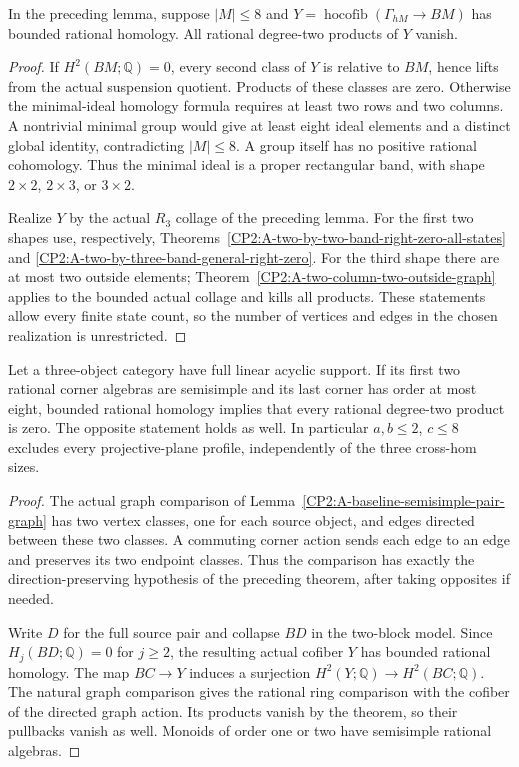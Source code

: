 \begin{theorem}
\label{CP2:A-directed-graph-eight}
In the preceding lemma, suppose $|M|\leq8$ and
$Y=\operatorname{hocofib}(\Gamma_{hM}\to BM)$ has bounded rational
homology.  All rational degree-two products of $Y$ vanish.
\end{theorem}
\begin{proof}
If $H^2(BM;\mathbb Q)=0$, every second class of $Y$ is relative
to $BM$, hence lifts from the actual suspension quotient.
Products of these classes are zero.
Otherwise the minimal-ideal homology formula requires at least
two rows and two columns.  A nontrivial minimal group would
give at least eight ideal elements and a distinct global identity,
contradicting $|M|\leq8$.  A group itself has no positive rational
cohomology.  Thus the minimal ideal is a proper rectangular band,
with shape $2\times2$, $2\times3$, or $3\times2$.

Realize $Y$ by the actual $R_3$ collage of the preceding lemma.
For the first two shapes use, respectively,
Theorems~\ref{CP2:A-two-by-two-band-right-zero-all-states} and
\ref{CP2:A-two-by-three-band-general-right-zero}.
For the third shape there are at most two outside elements;
Theorem~\ref{CP2:A-two-column-two-outside-graph} applies to the
bounded actual collage and kills all products.
These statements allow every finite state count, so the number
of vertices and edges in the chosen realization is unrestricted.
\end{proof}

\begin{corollary}
\label{CP2:A-semisimple-pair-eight}
Let a three-object category have full linear acyclic support.
If its first two rational corner algebras are semisimple and its
last corner has order at most eight, bounded rational homology
implies that every rational degree-two product is zero.
The opposite statement holds as well.  In particular
$a,b\leq2$, $c\leq8$ excludes every projective-plane profile,
independently of the three cross-hom sizes.
\end{corollary}
\begin{proof}
The actual graph comparison of
Lemma~\ref{CP2:A-baseline-semisimple-pair-graph} has two vertex
classes, one for each source object, and edges directed between
these two classes.  A commuting corner action sends each edge
to an edge and preserves its two endpoint classes.  Thus the
comparison has exactly the direction-preserving hypothesis of
the preceding theorem, after taking opposites if needed.

Write $D$ for the full source pair and collapse $BD$ in the
two-block model.  Since $H_j(BD;\mathbb Q)=0$ for $j\geq2$,
the resulting actual cofiber $Y$ has bounded rational homology.
The map $BC\to Y$ induces a surjection
$H^2(Y;\mathbb Q)\to H^2(BC;\mathbb Q)$.
The natural graph comparison gives the rational ring comparison
with the cofiber of the directed graph action.  Its products
vanish by the theorem, so their pullbacks vanish as well.
Monoids of order one or two have semisimple rational algebras.
\end{proof}

